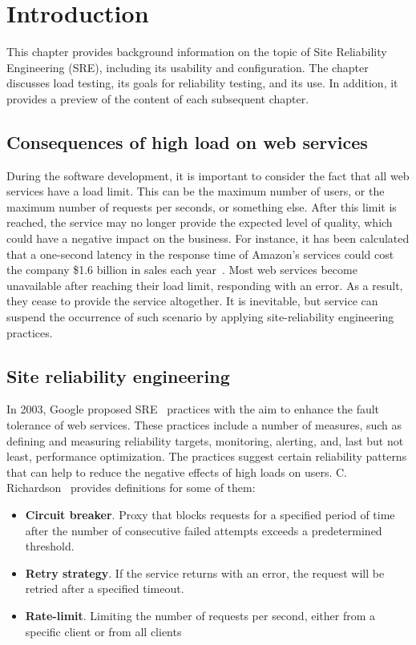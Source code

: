\chapter{Introduction}
\label{ch:intro}

This chapter provides background information on the topic of Site Reliability Engineering (SRE), including its usability and configuration. The chapter discusses load testing, its goals for reliability testing, and its use. In addition, it provides a preview of the content of each subsequent chapter.


\section{Consequences of high load on web services}\label{sec:consequences-of-high-load-on-web-services}
During the software development, it is important to consider the fact that all web services have a load limit. This can be the maximum number of users, or the maximum number of requests per seconds, or something else. After this limit is reached, the service may no longer provide the expected level of quality, which could have a negative impact on the business. For instance, it has been calculated that a one-second latency in the response time of Amazon's services could cost the company \$1.6 billion in sales each year~\cite{one_second_article}.
Most web services become unavailable after reaching their load limit, responding with an error. As a result, they cease to provide the service altogether. It is inevitable, but service can suspend the occurrence of such scenario by applying site-reliability engineering practices.



\section{Site reliability engineering}\label{sec:site-reliability-engineering}
In 2003, Google proposed SRE~\cite{google_sre} practices with the aim to enhance the fault tolerance of web services. These practices include a number of measures, such as defining and measuring reliability targets, monitoring, alerting, and, last but not least, performance optimization. The practices suggest certain reliability patterns that can help to reduce the negative effects of high loads on users.
C. Richardson~\cite{microservices} provides definitions for some of them:
\begin{itemize}
    \item \textbf{Circuit breaker}. Proxy that blocks requests for a specified period of time after the number of consecutive failed attempts exceeds a predetermined threshold.
    \item \textbf{Retry strategy}. If the service returns with an error, the request will be retried after a specified timeout.
    \item \textbf{Rate-limit}. Limiting the number of requests per second, either from a specific client or from all clients
\end{itemize}

